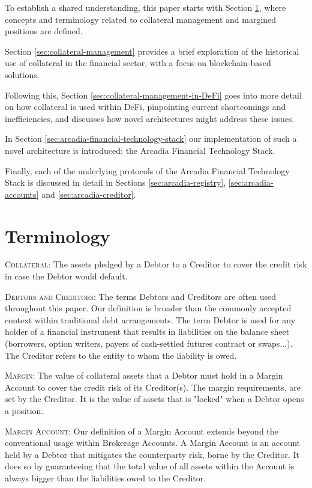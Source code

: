 \documentclass[sigconf,nonacm]{acmart}
\begin{document}
To establish a shared understanding, this paper starts with Section \ref{sec:terminology},
where concepts and terminology related to collateral management and margined positions are defined.

Section \ref{sec:collateral-management} provides a brief exploration of the historical use of collateral in the financial sector,
with a focus on blockchain-based solutions.

Following this, Section \ref{sec:collateral-management-in-DeFi} goes into more detail on how collateral is used within DeFi,
pinpointing current shortcomings and inefficiencies, and discusses how novel architectures might address these issues.

In Section \ref{sec:arcadia-financial-technology-stack} our implementation of such a novel architecture is introduced:
the Arcadia Financial Technology Stack.

Finally, each of the underlying protocols of the Arcadia Financial Technology Stack is discussed in detail 
in Sections \ref{sec:arcadia-registry}, \ref{sec:arcadia-accounts} and \ref{sec:arcadia-creditor}.

\section{Terminology}
\label{sec:terminology}
\textsc{Collateral:} The assets pledged by a Debtor to a Creditor to cover the credit risk in case the Debtor would default.

\textsc{Debtors and Creditors:} The terms Debtors and Creditors are often used throughout this paper.
Our definition is broader than the commonly accepted context within traditional debt arrangements.
The term Debtor is used for any holder of a financial instrument that results in liabilities on the balance sheet
(borrowers, option writers, payers of cash-settled futures contract or swaps...).
The Creditor refers to the entity to whom the liability is owed.

\textsc{Margin:} The value of collateral assets that a Debtor must hold in a Margin Account to cover the credit risk of its Creditor(s).
The margin requirements, are set by the Creditor.
It is the value of assets that is "locked" when a Debtor opens a position.

\textsc{Margin Account:} Our definition of a Margin Account extends beyond the conventional usage within Brokerage Accounts.
A Margin Account is an account held by a Debtor that mitigates the counterparty risk, borne by the Creditor.
It does so by guaranteeing that the total value of all assets within the Account is always bigger than the liabilities owed to the Creditor.
\end{document}

